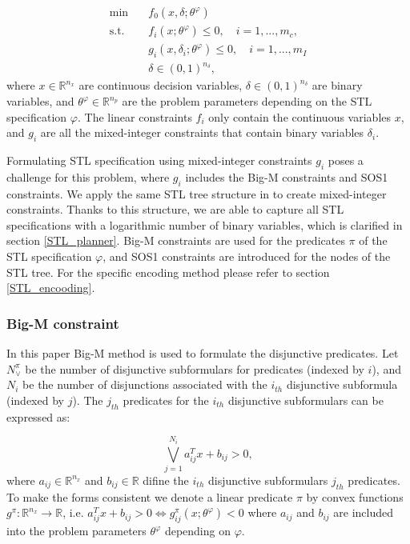\documentclass[a4paper]{report}
\begin{document}
\begin{equation}
    \label{eq1}%
    \begin{aligned}
        \min \quad       & f_0(x,\delta;\theta^\varphi )        \\
        \text{s.t.}\quad &
        f_i(x;\theta^\varphi ) \leq 0, \quad i=1,...,m_c,        \\                                         &
        g_i(x,\delta_i ;\theta^\varphi ) \leq 0, \quad i=1,...,m_I
        \\
                         & \delta \in(0,1)^{n_{\delta}},
    \end{aligned}
\end{equation}
where $x \in \mathbb{R} ^{n_{x}}$ are continuous decision variables, $\delta \in(0,1)^{n_{\delta}} $ are binary variables, and $\theta^\varphi \in \mathbb{R} ^{n_{p}}$ are the problem parameters depending on the STL specification $\varphi$. The linear constraints $f_i$ only contain the continuous variables $x$, and $g_i$ are all the mixed-integer constraints that contain binary variables $\delta_i$. 

Formulating STL specification using mixed-integer constraints $g_i$ poses a challenge for this problem, where $g_i$ includes the Big-M constraints and SOS1 constraints. We apply the same STL tree structure in \cite{kurtz2022mixed}\cite{leung2020back} to create mixed-integer constraints. Thanks to this structure, we are able to capture all STL specifications with a logarithmic number of binary variables, which is clarified in section \ref*{STL_planner}. Big-M constraints are used for the predicates $\pi$ of the STL specification $\varphi$, and SOS1 constraints are introduced for the nodes of the STL tree. For the specific encoding method please refer to section \ref*{STL_encooding}.


\subsubsection*{Big-M constraint}
In this paper Big-M method is used to formulate the disjunctive predicates. Let $N_\vee^{\pi}$ be the number of disjunctive subformulars for predicates (indexed by $i$), and $N_i$ be the number of disjunctions associated with the $i_{th}$ disjunctive subformula (indexed by $j$). The $j_{th}$ predicates for the $i_{th}$ disjunctive subformulars can be expressed as:

\begin{equation}
    \bigvee_{j=1}^{N_i} a_{ij}^Tx+b_{ij}>0,
\label{linear_predicates}
\end{equation}
where $a_{ij} \in \mathbb{R} ^{n_{x}} $ and $b_{ij} \in \mathbb{R}$ difine the $i_{th}$ disjunctive subformulars $j_{th} $ predicates.
To make the forms consistent we denote a linear predicate $\pi$ by convex functions $g^\pi
:\mathbb{R}^{n_x} \rightarrow \mathbb{R}$, i.e. $a_{ij}^Tx+b_{ij}>0 \Leftrightarrow  g_{ij}^\pi(x;\theta^\varphi)<0$ where $a_{ij}$ and $b_{ij}$ are included into the problem parameters $\theta^\varphi$ depending on $\varphi$.
 
\end{document}

